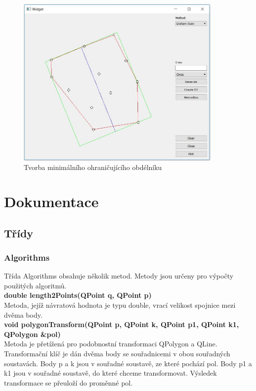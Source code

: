 \documentclass[a4paper, 12pt]{article}
\begin{document}
\begin{figure}[h!]
	\centering
	\includegraphics[width=10cm]{minBound.jpg}
	\caption{Tvorba minimálního ohraničujícího obdélníku}
\end{figure}

\clearpage

\section{Dokumentace}
\subsection{Třídy}
\subsubsection{Algorithms}
Třída Algorithms obsahuje několik metod. Metody jsou určeny pro výpočty použitých algoritmů.
\\

\textbf{double length2Points(QPoint q, QPoint p)}\\
Metoda, jejíž návratová hodnota je typu double, vrací velikost spojnice mezi dvěma body.
\\

\textbf{void polygonTransform(QPoint p, QPoint k, QPoint p1, QPoint k1, QPolygon \&pol)}\\
Metoda je přetížená pro  podobnostní transformaci QPolygon a QLine. Transformační klíč je dán dvěma body se souřadnicemi v obou souřadných soustavách. Body p a k jsou v souřadné soustavě, ze které pochází pol. Body p1 a k1 jsou v souřadné soustavě, do které chceme transformovat. Výsledek transformace se přeuloží do proměnné pol.
\\
\end{document}
